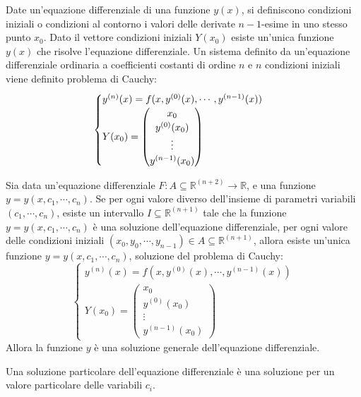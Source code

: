 \documentclass{article}
\numberwithin{equation}{subsection}
\begin{document}
Date un'equazione differenziale di una funzione $y(x)$, si definiscono condizioni iniziali o condizioni al contorno i valori delle derivate $n-1$-esime in uno stesso punto 
$x_0$. Dato il vettore condizioni iniziali $Y(x_0)$ esiste un'unica funzione $y(x)$ che risolve l'equazione differenziale. Un sistema 
definito da un'equazione differenziale ordinaria a coefficienti costanti di ordine $n$ e $n$ condizioni iniziali viene definito problema di Cauchy:
\begin{equation}
    \begin{cases}
        \strut y^{(n)}(x)=f(x,y^{(0)}(x),\cdots,y^{(n-1)}(x))\\
        Y(x_0)=\begin{pmatrix}
            x_0\\
            y^{(0)}(x_0)\\
            \vdots\\
            y^{(n-1)}(x_0)
        \end{pmatrix}
    \end{cases}
\end{equation}



Sia data un'equazione differenziale $F:A\subseteq\mathbb{R}^{(n+2)}\to\mathbb{R}$, e una funzione $y=y(x,c_1,\cdots,c_n)$. Se per 
ogni valore diverso dell'insieme di parametri variabili $(c_1,\cdots,c_n)$, esiste un intervallo $I\subseteq\mathbb{R}^{(n+1)}$ tale che la funzione $y=y(x,c_1,\cdots,c_n)$ è una soluzione 
dell'equazione differenziale, per ogni valore delle condizioni iniziali $(x_0,y_0,\cdots,y_{n-1})\in A\subseteq\mathbb{R}^{(n+1)}$, allora esiste un'unica funzione 
$y=y(x,c_1,\cdots,c_n)$, soluzione del problema di Cauchy:
\begin{equation*}
    \begin{cases}
        y^{(n)}(x)=f(x,y^{(0)}(x),\cdots,y^{(n-1)}(x))\\
        Y(x_0)=\begin{pmatrix}
            x_0\\
            y^{(0)}(x_0)\\
            \vdots\\
            y^{(n-1)}(x_0)
        \end{pmatrix}
    \end{cases}
\end{equation*}
Allora la funzione $y$ è una soluzione generale dell'equazione differenziale. 

Una soluzione particolare dell'equazione differenziale è una soluzione per un valore particolare delle variabili $c_i$. 
\end{document}
